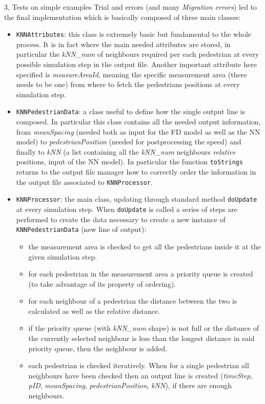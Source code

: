 \documentclass[10pt,a4paper]{article}
\begin{document}
\begin{task}{3, Tests on simple examples}
Trial and errors (and many \textit{Migration errors}) led to the final implementation which is basically composed of three main classes:
\begin{itemize}
    \item \texttt{KNNAttributes}: this class is extremely basic but fundamental to the whole process. It is in fact where the main needed attributes are stored, in particular the \textit{kNN\_num} of neighbours required per each pedestrian at every possible simulation step in the output file. Another important attribute here specified is \textit{measureAreaId}, meaning the specific measurement area (there needs to be one) from where to fetch the pedestrians positions at every simulation step.
    \item \texttt{KNNPedestrianData}: a class useful to define how the single output line is composed. In particular this class contains all the needed output information, from \textit{meanSpacing} (needed both as input for the FD model as well as the NN model) to \textit{pedestrianPosition} (needed for postprocessing the speed) and finally to \textit{kNN} (a list containing all the \textit{kNN\_num} neighbours \textit{relative} positions, input of the NN model). In particular the function \texttt{toStrings} returns to the output file manager how to correctly order the information in the output file associated to \texttt{KNNProcessor}.
    \item \texttt{KNNProcessor}: the main class, updating through standard method \texttt{doUpdate} at every simulation step. When \texttt{doUpdate} is called a series of steps are performed to create the data necessary to create a new instance of \texttt{KNNPedestrianData} (new line of output):
    \begin{itemize}
        \item the measurement area is checked to get all the pedestrians inside it at the given simulation step.
        \item for each pedestrian in the measurement area a priority queue is created (to take advantage of its property of ordering).
        \item for each neighbour of a pedestrian the distance between the two is calculated as well as the relative distance. 
        \item if the priority queue (with \textit{kNN\_num} shape) is not full or the distance of the currently selected neighbour is less than the longest distance in said priority queue, then the neighbour is added.
        \item each pedestrian is checked iteratively. When for a single pedestrian all neighbours have been checked then an output line is created (\textit{timeStep}, \textit{pID}, \textit{meanSpacing}, \textit{pedestrianPosition}, \textit{kNN}), if there are enough neighbours.
    \end{itemize}
\end{itemize}


\end{task}
\end{document}
